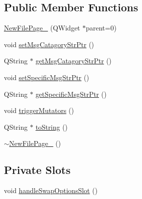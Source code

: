 \subsection*{Public Member Functions}
\begin{DoxyCompactItemize}
\item 
\hyperlink{class_new_file_page__3_a5f95cfa958e66c0908b5f07e888e2b18}{New\-File\-Page\-\_} (Q\-Widget $\ast$parent=0)
\item 
void \hyperlink{class_new_file_page__3_ab33ffb9bdcf669abd91d83bbdaffb232}{set\-Msg\-Catagory\-Str\-Ptr} ()
\item 
Q\-String $\ast$ \hyperlink{class_new_file_page__3_aa175534ea8aca4e3c2bc609f8a8892e7}{get\-Msg\-Catagory\-Str\-Ptr} ()
\item 
void \hyperlink{class_new_file_page__3_a42f57bfe122d2ea9163077a605d0fb20}{set\-Specific\-Msg\-Str\-Ptr} ()
\item 
Q\-String $\ast$ \hyperlink{class_new_file_page__3_ac63caca4f0f994ff5800cf90134e2993}{get\-Specific\-Msg\-Str\-Ptr} ()
\item 
void \hyperlink{class_new_file_page__3_a843704494f9ed68d86cb6ba0119b070b}{trigger\-Mutators} ()
\item 
Q\-String $\ast$ \hyperlink{class_new_file_page__3_a99c2ef9f88b626e06d616bfba4337497}{to\-String} ()
\item 
\hyperlink{class_new_file_page__3_a275afd63a9b329699b95892e5850651f}{$\sim$\-New\-File\-Page\-\_} ()
\end{DoxyCompactItemize}
\subsection*{Private Slots}
\begin{DoxyCompactItemize}
\item 
void \hyperlink{class_new_file_page__3_a277967fa1a15b25f3c8184b3d971ff53}{handle\-Swap\-Options\-Slot} ()
\end{DoxyCompactItemize}
